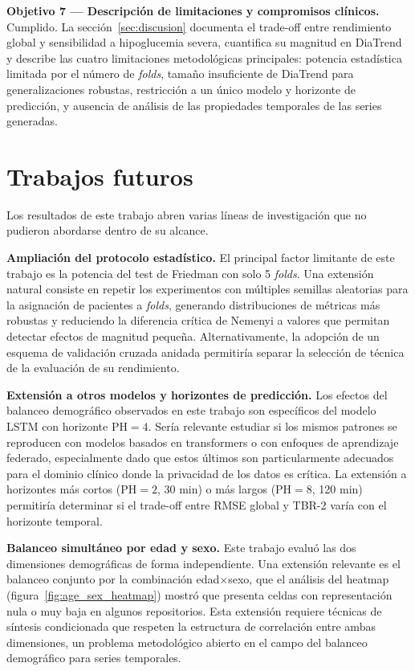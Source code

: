 \textbf{Objetivo 7 — Descripción de limitaciones y compromisos clínicos.}
Cumplido. La sección~\ref{sec:discusion} documenta el trade-off entre
rendimiento global y sensibilidad a hipoglucemia severa, cuantifica su
magnitud en DiaTrend y describe las cuatro limitaciones metodológicas
principales: potencia estadística limitada por el número de
\textit{folds}, tamaño insuficiente de DiaTrend para generalizaciones
robustas, restricción a un único modelo y horizonte de predicción, y
ausencia de análisis de las propiedades temporales de las series generadas.

\section{Trabajos futuros}
\label{sec:trabajos_futuros}

Los resultados de este trabajo abren varias líneas de investigación que
no pudieron abordarse dentro de su alcance.

\textbf{Ampliación del protocolo estadístico.} El principal factor
limitante de este trabajo es la potencia del test de Friedman con solo
5 \textit{folds}. Una extensión natural consiste en repetir los
experimentos con múltiples semillas aleatorias para la asignación de
pacientes a \textit{folds}, generando distribuciones de métricas más
robustas y reduciendo la diferencia crítica de Nemenyi a valores que
permitan detectar efectos de magnitud pequeña. Alternativamente, la
adopción de un esquema de validación cruzada anidada permitiría separar
la selección de técnica de la evaluación de su rendimiento.

\textbf{Extensión a otros modelos y horizontes de predicción.} Los
efectos del balanceo demográfico observados en este trabajo son específicos
del modelo LSTM con horizonte PH$=4$. Sería relevante estudiar si los
mismos patrones se reproducen con modelos basados en transformers o con
enfoques de aprendizaje federado, especialmente dado que estos últimos
son particularmente adecuados para el dominio clínico donde la privacidad
de los datos es crítica. La extensión a horizontes más cortos (PH$=2$,
30 min) o más largos (PH$=8$, 120 min) permitiría determinar si el
trade-off entre RMSE global y TBR-2 varía con el horizonte temporal.

\textbf{Balanceo simultáneo por edad y sexo.} Este trabajo evaluó las
dos dimensiones demográficas de forma independiente. Una extensión
relevante es el balanceo conjunto por la combinación edad$\times$sexo,
que el análisis del heatmap (figura~\ref{fig:age_sex_heatmap}) mostró
que presenta celdas con representación nula o muy baja en algunos
repositorios. Esta extensión requiere técnicas de síntesis condicionada
que respeten la estructura de correlación entre ambas dimensiones,
un problema metodológico abierto en el campo del balanceo demográfico
para series temporales.


